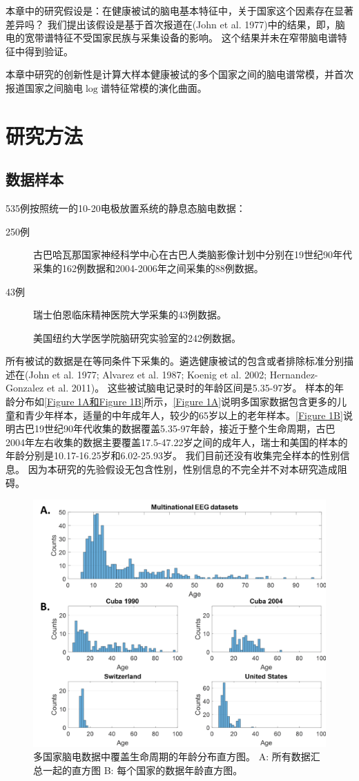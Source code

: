 本章中的研究假设是：在健康被试的脑电基本特征中，关于国家这个因素存在显著差异吗？ 我们提出该假设是基于首次报道在\cite{}(John et al. 1977)中的结果，即，脑电的宽带谱特征不受国家民族与采集设备的影响。 这个结果并未在窄带脑电谱特征中得到验证。

本章中研究的创新性是计算大样本健康被试的多个国家之间的脑电谱常模，并首次报道国家之间脑电$\log$谱特征常模的演化曲面。

\section{研究方法}
\subsection{数据样本}
535例按照统一的10-20电极放置系统的静息态脑电数据：
\begin{description}
\item[250例] 古巴哈瓦那国家神经科学中心在古巴人类脑影像计划中分别在19世纪90年代采集的162例数据和2004-2006年之间采集的88例数据。
\item[43例] 瑞士伯恩临床精神医院大学采集的43例数据。
\item[] 美国纽约大学医学院脑研究实验室的242例数据。
\end{description}
所有被试的数据是在等同条件下采集的。遴选健康被试的包含或者排除标准分别描述在\citing{}(John et al. 1977; Alvarez et al. 1987; Koenig et al. 2002; Hernandez-Gonzalez et al. 2011)。 这些被试脑电记录时的年龄区间是5.35-97岁。 样本的年龄分布如\ref{Figure 1A和Figure 1B}所示，\ref{Figure 1A}说明多国家数据包含更多的儿童和青少年样本，适量的中年成年人，较少的65岁以上的老年样本。\ref{Figure 1B}说明古巴19世纪90年代收集的数据覆盖5.35-97年龄，接近于整个生命周期，古巴2004年左右收集的数据主要覆盖17.5-47.22岁之间的成年人，瑞士和美国的样本的年龄分别是10.17-16.25岁和6.02-25.93岁。 我们目前还没有收集完全样本的性别信息。 因为本研究的先验假设无包含性别，性别信息的不完全并不对本研究造成阻碍。
\begin{figure}[!ht]
\includegraphics[width=15cm]{pic/Norm/figure1.png}
\caption{多国家脑电数据中覆盖生命周期的年龄分布直方图。 A: 所有数据汇总一起的直方图 B: 每个国家的数据年龄直方图。}
\label{fig1}
\end{figure}

